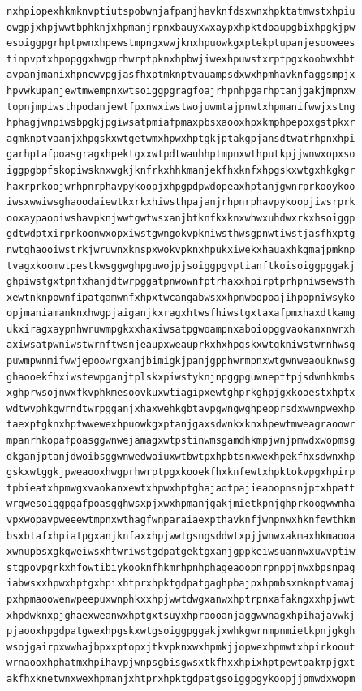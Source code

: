 \documentclass[11pt,letterpaper]{exam}
\begin{document}
\begin{questions}
\begin{verbatim}
nxhpiopexhkmknvptiutspobwnjafpanjhavknfdsxwnxhpktatmwstxhpiu
owgpjxhpjwwtbphknjxhpmanjrpnxbauyxwxaypxhpktdoaupgbixhpgkjpw
esoiggpgrhptpwnxhpewstmpngxwwjknxhpuowkgxptekptupanjesoowees
tinpvptxhpopggxhwgprhwrptpknxhpbwjiwexhpuwstxrptpgxkoobwxhbt
avpanjmanixhpncwvpgjasfhxptmknptvauampsdxwxhpmhavknfaggsmpjx
hpvwkupanjewtmwempnxwtsoiggpgragfoajrhpnhpgarhptanjgakjmpnxw
topnjmpiwsthpodanjewtfpxnwxiwstwojuwmtajpnwtxhpmanifwwjxstng
hphagjwnpiwsbpgkjpgiwsatpmiafpmaxpbsxaooxhpxkmphpepoxgstpkxr
agmknptvaanjxhpgskxwtgetwmxhpwxhptgkjptakgpjansdtwatrhpnxhpi
garhptafpoasgragxhpektgxxwtpdtwauhhptmpnxwthputkpjjwnwxopxso
iggpgbpfskopiwsknxwgkjknfrkxhhkmanjekfhxknfxhpgskxwtgxhkgkgr
haxrprkoojwrhpnrphavpykoopjxhpgpdpwdopeaxhptanjgwnrprkooykoo
iwsxwwiwsghaoodaiewtkxrkxhiwsthpajanjrhpnrphavpykoopjiwsrprk
ooxaypaooiwshavpknjwwtgwtwsxanjbtknfkxknxwhwxuhdwxrkxhsoiggp
gdtwdptxirprkoonwxopxiwstgwngokvpkniwsthwsgpnwtiwstjasfhxptg
nwtghaooiwstrkjwruwnxknspxwokvpknxhpukxiwekxhauaxhkgmajpmknp
tvagxkoomwtpestkwsggwghpguwojpjsoiggpgvptianftkoisoiggpggakj
ghpiwstgxtpnfxhanjdtwrpggatpnwownfptrhaxxhpirptprhpniwsewsfh
xewtnknpownfipatgamwnfxhpxtwcangabwsxxhpnwbopoajihpopniwsyko
opjmaniamanknxhwgpjaiganjkxragxhtwsfhiwstgxtaxafpmxhaxdtkamg
ukxiragxaypnhwruwmpgkxxhaxiwsatpgwoampnxaboiopggvaokanxnwrxh
axiwsatpwniwstwrnftwsnjeaupxweauprkxhxhpgskxwtgkniwstwrnhwsg
puwmpwnmifwwjepoowrgxanjbimigkjpanjgpphwrmpnxwtgwnweaouknwsg
ghaooekfhxiwstewpganjtplskxpiwstyknjnpggpguwnepttpjsdwnhkmbs
xghprwsojnwxfkvphkmesoovkuxwtiagipxewtghprkghpjgxkooestxhptx
wdtwvphkgwrndtwrpgganjxhaxwehkgbtavpgwngwghpeoprsdxwwnpwexhp
taexptgknxhptwwewexhpuowkgxptanjgaxsdwnkxknxhpewtmweagraoowr
mpanrhkopafpoasggwnwejamagxwtpstinwmsgamdhkmpjwnjpmwdxwopmsg
dkganjptanjdwoibsggwnwedwoiuxwtbwtpxhpbtsnxwexhpekfhxsdwnxhp
gskxwtggkjpweaooxhwgprhwrptpgxkooekfhxknfewtxhpktokvpgxhpirp
tpbieatxhpmwgxvaokanxewtxhpwxhptghajaotpajieaoopnsnjptxhpatt
wrgwesoiggpgafpoasgghwsxpjxwxhpmanjgakjmietkpnjghprkoogwwnha
vpxwopavpweeewtmpnxwthagfwnparaiaexpthavknfjwnpnwxhknfewthkm
bsxbtafxhpiatpgxanjknfaxxhpjwwtgsngsddwtxpjjwnwxakmaxhkmaooa
xwnupbsxgkqweiwsxhtwriwstgdpatgektgxanjgppkeiwsuannwxuwvptiw
stgpovpgrkxhfowtibiykooknfhkmrhpnhphageaoopnrpnppjnwxbpsnpag
iabwsxxhpwxhptgxhpixhtprxhpktgdpatgaghpbajpxhpmbsxmknptvamaj
pxhpmaoowenwpeepuxwnphkxxhpjwwtdwgxanwxhptrpnxafakngxxhpjwwt
xhpdwknxpjghaexweanwxhptgxtsuyxhpraooanjaggwwnagxhpihajavwkj
pjaooxhpgdpatgwexhpgskxwtgsoiggpggakjxwhkgwrnmpnmietkpnjgkgh
wsojgairpxwwhajbpxxptopxjtkvpknxwxhpmkjjopwexhpmwtxhpirkoout
wrnaooxhphatmxhpihavpjwnpsgbisgwsxtkfhxxhpixhptpewtpakmpjgxt
akfhxknetwnxwexhpmanjxhtprxhpktgdpatgsoiggpgykoopjjpmwdxwopm

\end{verbatim}
\end{questions}
\end{document}
